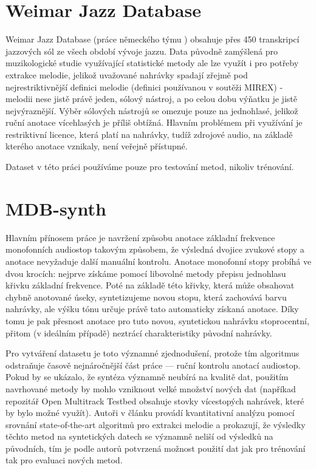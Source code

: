 \section{Weimar Jazz Database}

Weimar Jazz Database (práce německého týmu \cite{Pfleiderer}) obsahuje přes 450 transkripcí jazzových sól ze všech období vývoje jazzu. Data původně zamýšlená pro muzikologické studie využívající statistické metody ale lze využít i pro potřeby extrakce melodie, jelikož uvažované nahrávky spadají zřejmě pod nejrestriktivnější definici melodie (definici používanou v soutěži MIREX) - melodii nese jistě právě jeden, sólový nástroj, a po celou dobu výňatku je jistě nejvýraznější. Výběr sólových nástrojů se omezuje pouze na jednohlasé, jelikož ruční anotace vícehlasých je příliš obtížná. Hlavním problémem při využívání je restriktivní licence, která platí na nahrávky, tudíž zdrojové audio, na základě kterého anotace vznikaly, není veřejně přístupné. 

Dataset v této práci používáme pouze pro testování metod, nikoliv trénování.


\section{MDB-synth}\label{sec:mdb_synth}

Hlavním přínosem práce \cite{Salamon2017} je navržení způsobu anotace základní frekvence monofonních audiostop takovým způsobem, že výsledná dvojice zvukové stopy a anotace nevyžaduje další manuální kontrolu. Anotace monofonní stopy probíhá ve dvou krocích: nejprve získáme pomocí libovolné metody přepisu jednohlasu křivku základní frekvence. Poté na základě této křivky, která může obsahovat chybně anotované úseky, syntetizujeme novou stopu, která zachovává barvu nahrávky, ale výšku tónu určuje právě tato automaticky získaná anotace. Díky tomu je pak přesnost anotace pro tuto novou, syntetickou nahrávku stoprocentní, přitom (v ideálním případě) neztrácí charakteristiky původní nahrávky.

Pro vytváření datasetu je toto významné zjednodušení, protože tím algoritmus odstraňuje časově nejnáročnější část práce --- ruční kontrolu anotací audiostop. Pokud by se ukázalo, že syntéza významně neubírá na kvalitě dat, použitím navrhované metody by mohlo vzniknout velké množství nových dat (napříkad repozitář Open Multitrack Testbed obsahuje stovky vícestopých nahrávek, které by bylo možné využít). Autoři v článku provádí kvantitativní analýzu pomocí srovnání state-of-the-art algoritmů pro extrakci melodie a prokazují, že výsledky těchto metod na syntetických datech se významně neliší od výsledků na původních, tím je podle autorů potvrzená možnost použití dat jak pro trénování tak pro evaluaci nových metod.

